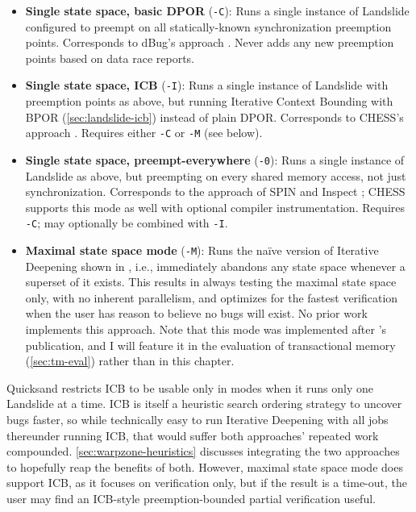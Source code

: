 \begin{itemize}
	\item {\bf Single state space, basic DPOR} ({\tt -C}):
		Runs a single instance of Landslide configured to preempt
		on all statically-known synchronization preemption points.
		Corresponds to dBug's approach \cite{dbug-ssv}.
		Never adds any new preemption points based on data race reports.
	\item {\bf Single state space, ICB} ({\tt -I}):
		Runs a single instance of Landslide with preemption points as above,
		but running Iterative Context Bounding with BPOR (\cref{sec:landslide-icb})
		instead of plain DPOR.
		Corresponds to CHESS's approach \cite{chess}.
		Requires either {\tt -C} or {\tt -M} (see below).
	\item {\bf Single state space, preempt-everywhere} ({\tt -0}):
		Runs a single instance of Landslide as above,
		but preempting on every shared memory access, not just synchronization.
		Corresponds to the approach of SPIN \cite{spin} and Inspect \cite{inspect};
		CHESS supports this mode as well with optional compiler instrumentation.
		Requires {\tt -C}; may optionally be combined with {\tt -I}.
	\item {\bf Maximal state space mode} ({\tt -M}):
		Runs the na\"{i}ve version of Iterative Deepening shown in ,
		i.e.,
		immediately abandons any state space whenever a superset of it exists.
		This results in always testing the maximal state space only, with no inherent parallelism,
		and optimizes for the fastest verification when the user has reason to believe no bugs will exist.
		No prior work implements this approach.
		Note that this mode was implemented after \cite{quicksand}'s publication,
		and I will feature it in the evaluation of transactional memory
		(\cref{sec:tm-eval}) rather than in this chapter.
\end{itemize}

Quicksand restricts ICB to be usable only in modes when it runs only one Landslide at a time.
ICB is itself a heuristic search ordering strategy to uncover bugs faster,
so while technically easy to run Iterative Deepening with all jobs thereunder running ICB,
that would suffer both approaches' repeated work compounded.
\cref{sec:warpzone-heuristics} discusses integrating the two approaches to hopefully reap the benefits of both.
However, maximal state space mode does support ICB,
as it focuses on verification only,
but if the result is a time-out,
the user may find an ICB-style preemption-bounded partial verification useful.

